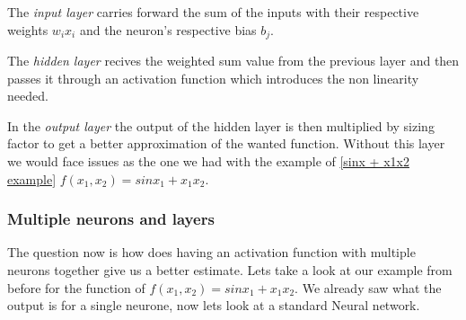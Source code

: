 \documentclass[12pt, a4paper]{article}
\begin{document}
The \emph{input layer} carries forward the sum of the inputs with their respective weights $w_ix_i$ and the neuron's respective bias $b_j$. 

The \emph{hidden layer} recives the weighted sum value from the previous layer and then passes it through an activation function which introduces the non linearity needed. 

In the \emph{output layer} the output of the hidden layer is then multiplied by sizing factor to get a better approximation of the wanted function. Without this layer we would face issues as the one we had with the example of \ref{sinx + x1x2 example} $f(x_1,x_2) = sinx_1 + x_1x_2$. 



\subsubsection{Multiple neurons and layers} 


The question now is how does having an activation function with multiple neurons together give us a better estimate. Lets take a look at our example from before for the function of $f(x_1,x_2) = sinx_1 +  x_1x_2$. We already saw what the output is for a single neurone, now lets look at a standard Neural network. 
\end{document}

